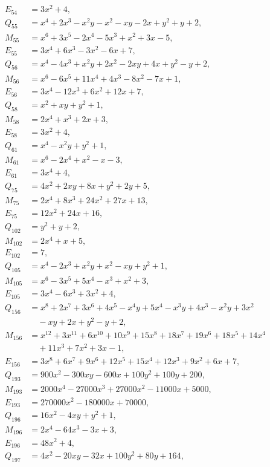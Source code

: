 \documentclass[11pt]{article}
\begin{document}
\begin{align*}
E_{54}&=3x^{2}+4,\\
Q_{55}&=x^{4}+2x^{3}-x^{2}y-x^{2}-xy-2x+y^{2}+y+2,\\
M_{55}&=x^{6}+3x^{5}-2x^{4}-5x^{3}+x^{2}+3x-5,\\
E_{55}&=3x^{4}+6x^{3}-3x^{2}-6x+7,\\
Q_{56}&=x^{4}-4x^{3}+x^{2}y+2x^{2}-2xy+4x+y^{2}-y+2,\\
M_{56}&=x^{6}-6x^{5}+11x^{4}+4x^{3}-8x^{2}-7x+1,\\
E_{56}&=3x^{4}-12x^{3}+6x^{2}+12x+7,\\
Q_{58}&=x^{2}+xy+y^{2}+1,\\
M_{58}&=2x^{4}+x^{3}+2x+3,\\
E_{58}&=3x^{2}+4,\\
Q_{61}&=x^{4}-x^{2}y+y^{2}+1,\\
M_{61}&=x^{6}-2x^{4}+x^{2}-x-3,\\
E_{61}&=3x^{4}+4,\\
Q_{75}&=4x^{2}+2xy+8x+y^{2}+2y+5,\\
M_{75}&=2x^{4}+8x^{3}+24x^{2}+27x+13,\\
E_{75}&=12x^{2}+24x+16,\\
Q_{102}&=y^{2}+y+2,\\
M_{102}&=2x^{4}+x+5,\\
E_{102}&=7,\\
Q_{105}&=x^{4}-2x^{3}+x^{2}y+x^{2}-xy+y^{2}+1,\\
M_{105}&=x^{6}-3x^{5}+5x^{4}-x^{3}+x^{2}+3,\\
E_{105}&=3x^{4}-6x^{3}+3x^{2}+4,\\
Q_{156}&=x^{8}+2x^{7}+3x^{6}+4x^{5}-x^{4}y+5x^{4}-x^{3}y+4x^{3}-x^{2}y+3x^{2}\\
&\quad-xy+2x+y^{2}-y+2,\\
M_{156}&=x^{12}+3x^{11}+6x^{10}+10x^{9}+15x^{8}+18x^{7}+19x^{6}+18x^{5}+14x^{4}\\
&\quad+11x^{3}+7x^{2}+3x-1,\\
E_{156}&=3x^{8}+6x^{7}+9x^{6}+12x^{5}+15x^{4}+12x^{3}+9x^{2}+6x+7,\\
Q_{193}&=900x^{2}-300xy-600x+100y^{2}+100y+200,\\
M_{193}&=2000x^{4}-27000x^{3}+27000x^{2}-11000x+5000,\\
E_{193}&=270000x^{2}-180000x+70000,\\
Q_{196}&=16x^{2}-4xy+y^{2}+1,\\
M_{196}&=2x^{4}-64x^{3}-3x+3,\\
E_{196}&=48x^{2}+4,\\
Q_{197}&=4x^{2}-20xy-32x+100y^{2}+80y+164,\\

\end{align*}
\end{document}
